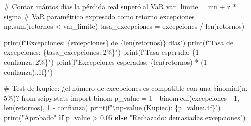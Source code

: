 \documentclass[
  spanish,
  letterpaper,
  DIV=11,
  numbers=noendperiod]{scrreprt}
\newenvironment{Shaded}{\begin{snugshade}}{\end{snugshade}}
\newcommand{\BuiltInTok}[1]{\textcolor[rgb]{0.00,0.23,0.31}{#1}}
\newcommand{\CharTok}[1]{\textcolor[rgb]{0.13,0.47,0.30}{#1}}
\newcommand{\CommentTok}[1]{\textcolor[rgb]{0.37,0.37,0.37}{#1}}
\newcommand{\ControlFlowTok}[1]{\textcolor[rgb]{0.00,0.23,0.31}{\textbf{#1}}}
\newcommand{\DecValTok}[1]{\textcolor[rgb]{0.68,0.00,0.00}{#1}}
\newcommand{\FloatTok}[1]{\textcolor[rgb]{0.68,0.00,0.00}{#1}}
\newcommand{\ImportTok}[1]{\textcolor[rgb]{0.00,0.46,0.62}{#1}}
\newcommand{\NormalTok}[1]{\textcolor[rgb]{0.00,0.23,0.31}{#1}}
\newcommand{\OperatorTok}[1]{\textcolor[rgb]{0.37,0.37,0.37}{#1}}
\newcommand{\SpecialCharTok}[1]{\textcolor[rgb]{0.37,0.37,0.37}{#1}}
\newcommand{\SpecialStringTok}[1]{\textcolor[rgb]{0.13,0.47,0.30}{#1}}
\newcommand{\StringTok}[1]{\textcolor[rgb]{0.13,0.47,0.30}{#1}}
\begin{document}
\label{backtesting}
\begin{Shaded}
\begin{Highlighting}[]
\CommentTok{\# Contar cuántos días la pérdida real superó al VaR}
\NormalTok{var\_limite }\OperatorTok{=}\NormalTok{ mu }\OperatorTok{+}\NormalTok{ z }\OperatorTok{*}\NormalTok{ sigma  }\CommentTok{\# VaR paramétrico expresado como retorno}
\NormalTok{excepciones }\OperatorTok{=}\NormalTok{ np.}\BuiltInTok{sum}\NormalTok{(retornos }\OperatorTok{\textless{}}\NormalTok{ var\_limite)}
\NormalTok{tasa\_excepciones }\OperatorTok{=}\NormalTok{ excepciones }\OperatorTok{/} \BuiltInTok{len}\NormalTok{(retornos)}

\BuiltInTok{print}\NormalTok{(}\SpecialStringTok{f"Excepciones: }\SpecialCharTok{\{}\NormalTok{excepciones}\SpecialCharTok{\}}\SpecialStringTok{ de }\SpecialCharTok{\{}\BuiltInTok{len}\NormalTok{(retornos)}\SpecialCharTok{\}}\SpecialStringTok{ días"}\NormalTok{)}
\BuiltInTok{print}\NormalTok{(}\SpecialStringTok{f"Tasa de excepciones: }\SpecialCharTok{\{}\NormalTok{tasa\_excepciones}\SpecialCharTok{:.2\%\}}\SpecialStringTok{"}\NormalTok{)}
\BuiltInTok{print}\NormalTok{(}\SpecialStringTok{f"Tasa esperada:       }\SpecialCharTok{\{}\DecValTok{1} \OperatorTok{{-}}\NormalTok{ confianza}\SpecialCharTok{:.2\%\}}\SpecialStringTok{"}\NormalTok{)}
\BuiltInTok{print}\NormalTok{(}\SpecialStringTok{f"Excepciones esperadas: }\SpecialCharTok{\{}\BuiltInTok{len}\NormalTok{(retornos) }\OperatorTok{*}\NormalTok{ (}\DecValTok{1} \OperatorTok{{-}}\NormalTok{ confianza)}\SpecialCharTok{:.1f\}}\SpecialStringTok{"}\NormalTok{)}

\CommentTok{\# Test de Kupiec: ¿el número de excepciones es compatible con una binomial(n, 5\%)?}
\ImportTok{from}\NormalTok{ scipy.stats }\ImportTok{import}\NormalTok{ binom}
\NormalTok{p\_value }\OperatorTok{=} \DecValTok{1} \OperatorTok{{-}}\NormalTok{ binom.cdf(excepciones }\OperatorTok{{-}} \DecValTok{1}\NormalTok{, }\BuiltInTok{len}\NormalTok{(retornos), }\DecValTok{1} \OperatorTok{{-}}\NormalTok{ confianza)}
\BuiltInTok{print}\NormalTok{(}\SpecialStringTok{f"}\CharTok{\textbackslash{}n}\SpecialStringTok{p{-}value (Kupiec): }\SpecialCharTok{\{}\NormalTok{p\_value}\SpecialCharTok{:.4f\}}\SpecialStringTok{"}\NormalTok{)}
\BuiltInTok{print}\NormalTok{(}\StringTok{"Aprobado"} \ControlFlowTok{if}\NormalTok{ p\_value }\OperatorTok{\textgreater{}} \FloatTok{0.05} \ControlFlowTok{else} \StringTok{"Rechazado: demasiadas excepciones"}\NormalTok{)}
\end{Highlighting}
\end{Shaded}
\end{document}
